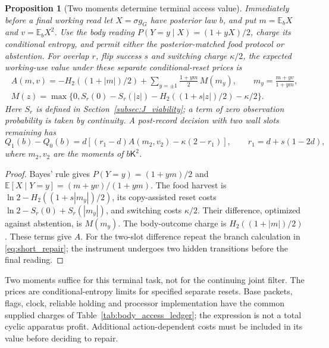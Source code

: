 \documentclass[12pt]{article}
\newtheorem{proposition}[theorem]{Proposition}
\theoremstyle{definition}
\newcommand{\E}{\mathbb E}
\begin{document}
\begin{proposition}[Two moments determine terminal access value]
\label{prop:access_moments}
Immediately before a final working read let $X=\sigma g_G$ have posterior
law $b$, and put $m=\E_bX$ and $v=\E_bX^2$. Use the body reading
$P(Y=y\mid X)=(1+yX)/2$, charge its conditional entropy, and permit either
the posterior-matched food protocol or abstention. For overlap $r$, flip
success $s$ and switching charge $\kappa/2$, the expected working-use
value under these separate conditional-reset prices is
\begin{equation}\label{eq:terminal_access_value}
\begin{gathered}
A(m,v)=-H_2((1+|m|)/2)+
 \sum_{y=\pm1}\frac{1+ym}{2}\,M(m_y),\qquad
m_y=\frac{m+yv}{1+ym},\\
M(z)=\max\{0,S_r(0)-S_r(|z|)
             -H_2((1+s|z|)/2)-\kappa/2\}.
\end{gathered}
\end{equation}
Here $S_r$ is defined in Section~\ref{subsec:J_viability}; a term of zero
observation probability is taken by continuity. A post-record decision
with two wall slots remaining has
\begin{equation}\label{eq:drifting_repair}
 Q_1(b)-Q_0(b)
 =d[(r_1-d)A(m_2,v_2)-\kappa(2-r_1)],\qquad
 r_1=d+s(1-2d),
\end{equation}
where $m_2,v_2$ are the moments of $b\mathsf K^2$.
\end{proposition}
\begin{proof}
Bayes' rule gives $P(Y=y)=(1+ym)/2$ and
$\E[X\mid Y=y]=(m+yv)/(1+ym)$. The food harvest is
$\ln2-H_2((1+s|m_y|)/2)$, its copy-assisted reset costs
$\ln2-S_r(0)+S_r(|m_y|)$, and switching costs $\kappa/2$.
Their difference, optimized against abstention, is $M(m_y)$.
The body-outcome charge is $H_2((1+|m|)/2)$. These terms give $A$.
For the two-slot difference repeat the branch calculation in
\eqref{eq:short_repair}; the instrument undergoes two hidden transitions
before the final reading.
\end{proof}

Two moments suffice for this terminal task, not for the continuing
joint filter. The prices are conditional-entropy limits for specified
separate resets. Base packets, flags, clock, reliable holding and
processor implementation have the common supplied charges of
Table~\ref{tab:body_access_ledger}; the expression is not a total cyclic
apparatus profit. Additional action-dependent costs must be included
in its value before deciding to repair.
\end{document}
